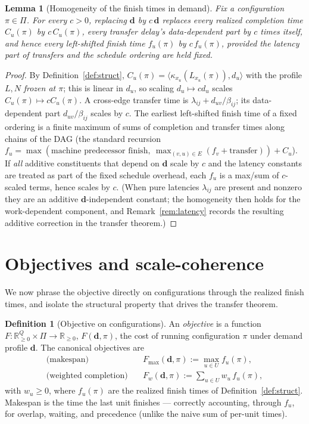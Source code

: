 \documentclass{amsart}
\newtheorem{lemma}{Lemma}
\theoremstyle{definition}
\newtheorem{definition}{Definition}
\begin{document}
\begin{lemma}[Homogeneity of the finish times in demand]\label{lem:homog}
Fix a configuration $\pi\in\Pi$. For every $c>0$, replacing $\mathbf d$ by
$c\,\mathbf d$ replaces every realized completion time $C_u(\pi)$ by
$c\,C_u(\pi)$, every transfer delay's data-dependent part by $c$ times itself,
and hence every left-shifted finish time $f_u(\pi)$ by $c\,f_u(\pi)$, provided
the latency part of transfers and the schedule \emph{ordering} are held fixed.
\end{lemma}

\begin{proof}
By Definition~\ref{def:struct}, $C_u(\pi)=\langle\kappa_{x_u}(L_{x_u}(\pi)),d_u\rangle$
with the profile $L,N$ \emph{frozen at $\pi$}; this is linear in $d_u$, so
scaling $d_u\mapsto c d_u$ scales $C_u(\pi)\mapsto cC_u(\pi)$. A cross-edge
transfer time is $\lambda_{ij}+d_{uv}/\beta_{ij}$; its data-dependent part
$d_{uv}/\beta_{ij}$ scales by $c$. The earliest left-shifted finish time of a
fixed ordering is a finite maximum of sums of completion and transfer times
along chains of the DAG (the standard recursion
$f_u=\max(\text{machine predecessor finish},\ \max_{(v,u)\in E}(f_v+\text{transfer}))+C_u$).
If \emph{all} additive constituents that depend on $\mathbf d$ scale by $c$ and
the latency constants are treated as part of the fixed schedule overhead,
each $f_u$ is a max/sum of $c$-scaled terms, hence scales by $c$. (When pure
latencies $\lambda_{ij}$ are present and nonzero they are an additive
$\mathbf d$-independent constant; the homogeneity then holds for the
work-dependent component, and Remark~\ref{rem:latency} records the resulting
additive correction in the transfer theorem.)
\end{proof}

\section{Objectives and scale-coherence}\label{sec:objective}

We now phrase the objective directly on configurations through the realized
finish times, and isolate the structural property that drives the transfer
theorem.

\begin{definition}[Objective on configurations]\label{def:obj}
An \emph{objective} is a function $F\colon\mathbb{R}^Q_{\ge0}\times\Pi\to
\mathbb{R}_{\ge0}$, $F(\mathbf d,\pi)$, the cost of running configuration $\pi$
under demand profile $\mathbf d$. The canonical objectives are
\begin{align}
\text{(makespan)}\quad &F_{\max}(\mathbf d,\pi):=\max_{u\in U} f_u(\pi),
\label{eq:makespan}\\
\text{(weighted completion)}\quad &F_{w}(\mathbf d,\pi):=\sum_{u\in U} w_u\, f_u(\pi),
\label{eq:wsum}
\end{align}
with $w_u\ge0$, where $f_u(\pi)$ are the realized finish times of
Definition~\ref{def:struct}. Makespan is the time the last unit finishes —
correctly accounting, through $f_u$, for overlap, waiting, and precedence
(unlike the naive sum of per-unit times).
\end{definition}
\end{document}
